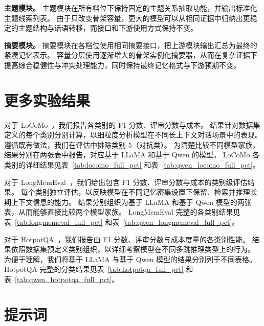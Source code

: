 \textbf{主题模块。}
主题模块在所有档位下保持固定的主题关系抽取功能，并输出标准化主题线索列表。
由于只改变骨架容量，更大的模型可以从相同证据中归纳出更稳定的主题结构与话语转移，而接口和下游使用方式保持不变。

\textbf{摘要模块。}
摘要模块在各档位使用相同摘要接口，把上游模块输出汇总为最终的紧凑记忆表示。
容量分层使用逐渐增大的骨架实例化摘要器，从而在复杂证据下提高综合稳健性与冲突处理能力，同时保持最终记忆格式与下游预期不变。

\section{更多实验结果}
\label{appendix:exp_results}

对于 LoCoMo~\citep{maharana2024evaluating-locomo}，我们报告各类别的 F1 分数、评审分数与成本。
结果针对数据集定义的每个类别分别计算，以细粒度分析模型在不同长上下文对话场景中的表现。
遵循既有做法，我们在评估中排除类别 5（对抗类）。
为清楚比较不同模型家族，结果分别在两张表中报告，对应基于 LLaMA 和基于 Qwen 的模型。
LoCoMo 各类别的详细结果见表~\ref{tab:locomo_full_pct} 和表~\ref{tab:qwen_locomo_full_pct}。




对于 LongMemEval~\citep{wu2024longmemeval}，我们给出包含 F1 分数、评审分数与成本的类别级评估结果。
每个类别独立评估，以反映模型在不同记忆密集设置下保留、检索并推理长期上下文信息的能力。
结果分别组织为基于 LLaMA 和基于 Qwen 模型的两张表，从而能够直接比较两个模型家族。
LongMemEval 完整的各类别结果见表~\ref{tab:longmemeval_full_pct} 和表~\ref{tab:qwen_longmemeval_full_pct}。




对于 HotpotQA~\cite{yang2018hotpotqa}，我们报告由 F1 分数、评审分数与成本度量的各类别性能。
结果依照数据集预定义类别组织，以详细考察模型在不同多跳推理类型上的行为。
为便于理解，我们将基于 LLaMA 与基于 Qwen 模型的结果分别列于不同表格。
HotpotQA 完整的分类结果见表~\ref{tab:hotpotqa_full_pct} 和表~\ref{tab:qwen_hotpotqa_full_pct}。




\section{提示词}
\label{appendix:prompts}


